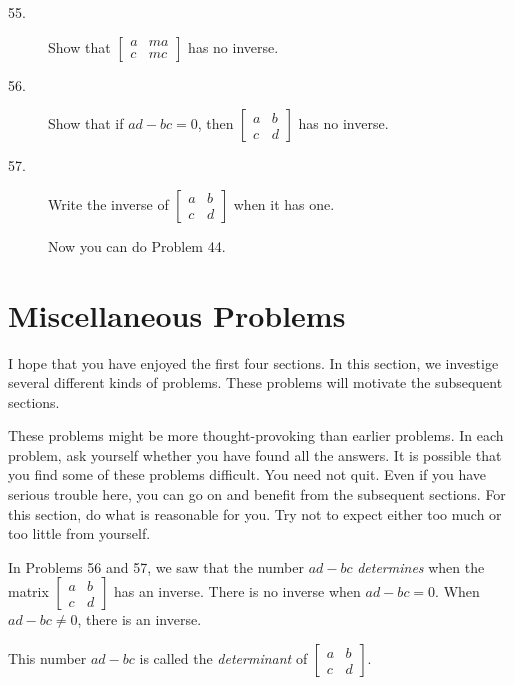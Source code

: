 \documentclass{article}
\begin{document}
\begin{description}
  \item[55.] Show that $\begin{bmatrix} a & ma \\ c & mc \end{bmatrix}$ has no inverse. 

  \item[56.] Show that if $ad - bc = 0$, then $\begin{bmatrix} a & b \\ c & d \end{bmatrix}$ has no inverse.

  \item[57.] Write the inverse of $\begin{bmatrix} a & b \\ c & d \end{bmatrix}$ when it has one. 

  \item[] Now you can do Problem 44.

\end{description}




\newpage

\section{Miscellaneous Problems}

I hope that you have enjoyed the first four sections. In this section, we investige several different kinds of problems. These problems will motivate the subsequent sections.

These problems might be more thought-provoking than earlier problems. In each problem, ask yourself whether you have found all the answers. It is possible that you find some of these problems difficult. You need not quit. Even if you have serious trouble here, you can go on and benefit from the subsequent sections. For this section, do what is reasonable for you. Try not to expect either too much or too little from yourself.

In Problems 56 and 57, we saw that the number $ad-bc$ \emph{determines} when the matrix $\begin{bmatrix} a & b \\ c & d \end{bmatrix}$ has an inverse. There is no inverse when $ad-bc = 0$. When $ad-bc \neq 0$, there is an inverse.

This number $ad-bc$ is called the \emph{determinant} of $\begin{bmatrix} a & b \\ c & d \end{bmatrix}$.
\end{document}
